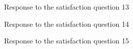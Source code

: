 \documentclass[12pt,oneside,openright,a4paper]{cpe-english-project}
\begin{document}
\begin{figure}[!h]\centering {} \caption{Response to the satisfaction question 13} \end{figure}
\begin{figure}[!h]\centering {} \caption{Response to the satisfaction question 14} \end{figure}
\begin{figure}[!h]\centering {} \caption{Response to the satisfaction question 15} \end{figure}
\end{document}
